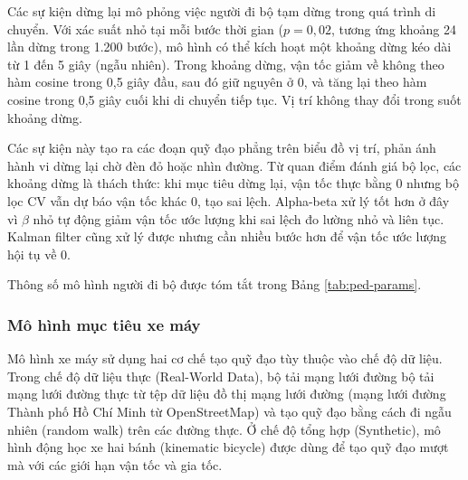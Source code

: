 Các sự kiện dừng lại mô phỏng việc người đi bộ tạm dừng trong quá trình di chuyển. Với xác suất nhỏ tại mỗi bước thời gian ($p = 0{,}02$, tương ứng khoảng 24 lần dừng trong 1.200 bước), mô hình có thể kích hoạt một khoảng dừng kéo dài từ 1 đến 5 giây (ngẫu nhiên). Trong khoảng dừng, vận tốc giảm về không theo hàm cosine trong 0,5 giây đầu, sau đó giữ nguyên ở 0, và tăng lại theo hàm cosine trong 0,5 giây cuối khi di chuyển tiếp tục. Vị trí không thay đổi trong suốt khoảng dừng.

Các sự kiện này tạo ra các đoạn quỹ đạo phẳng trên biểu đồ vị trí, phản ánh hành vi dừng lại chờ đèn đỏ hoặc nhìn đường. Từ quan điểm đánh giá bộ lọc, các khoảng dừng là thách thức: khi mục tiêu dừng lại, vận tốc thực bằng 0 nhưng bộ lọc CV vẫn dự báo vận tốc khác 0, tạo sai lệch. Alpha-beta xử lý tốt hơn ở đây vì $\beta$ nhỏ tự động giảm vận tốc ước lượng khi sai lệch đo lường nhỏ và liên tục. Kalman filter cũng xử lý được nhưng cần nhiều bước hơn để vận tốc ước lượng hội tụ về 0.

Thông số mô hình người đi bộ được tóm tắt trong Bảng \ref{tab:ped-params}.

\begin{table}[H]
\centering
\caption{Thông số mô hình người đi bộ}
\label{tab:ped-params}
\end{table}

\subsubsection{Mô hình mục tiêu xe máy}

\hspace{0.5cm} Mô hình xe máy sử dụng hai cơ chế tạo quỹ đạo tùy thuộc vào chế độ dữ liệu. Trong chế độ dữ liệu thực (Real-World Data), bộ tải mạng lưới đường bộ tải mạng lưới đường thực từ tệp dữ liệu đồ thị mạng lưới đường (mạng lưới đường Thành phố Hồ Chí Minh từ OpenStreetMap) và tạo quỹ đạo bằng cách đi ngẫu nhiên (random walk) trên các đường thực. Ở chế độ tổng hợp (Synthetic), mô hình động học xe hai bánh (kinematic bicycle) được dùng để tạo quỹ đạo mượt mà với các giới hạn vận tốc và gia tốc.


